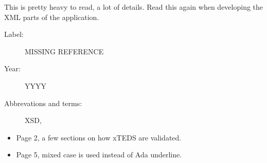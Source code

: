 This is pretty heavy to read, a lot of details. Read this again when developing
the XML parts of the application.

\begin{description}
    \item[Label:] MISSING REFERENCE %
    \item[Year:] YYYY
    \item[Abbrevations and terms:]
        XSD,
\end{description}

\begin{itemize}
    \item Page 2, a few sections on how xTEDS are validated.
    \item Page 5, mixed case is used instead of Ada underline.
\end{itemize}

%
%
%
%
